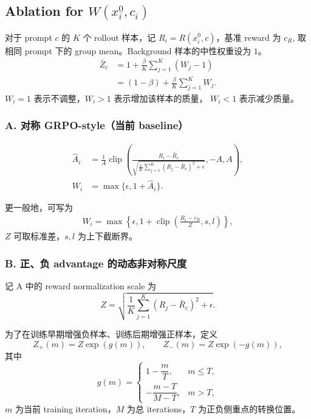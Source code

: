\documentclass[10pt]{article}
\begin{document}
\newpage 

\subsection{Ablation for $W(x_i^0,c_i)$}

对于 prompt $c$ 的 $K$ 个 rollout 样本，记
$R_i=R(x_i^0,c)$，基准 reward 为 $c_R$, 取相同 prompt 下的 group mean。Background 样本的中性权重设为 $1$。
\begin{align}
\bar Z_c
&=1+\frac{\beta}{K}\sum_{j=1}^{K}(W_j-1) \\
&=(1-\beta)+\frac{\beta}{K}\sum_{j=1}^{K}W_j.
\end{align}
$W_i=1$ 表示不调整，$W_i>1$ 表示增加该样本的质量，
$W_i<1$ 表示减少质量。

\subsubsection*{A. 对称 GRPO-style（当前 baseline）}

\begin{align}
\widehat A_i
&=
\frac{1}{A}
\operatorname{clip}\!\left(
\frac{R_i-\bar R_c}
{\sqrt{\frac{1}{K}\sum_{j=1}^{K}(R_j-\bar R_c)^2+\epsilon}},
-A,A
\right), \\
W_i
&=\max\{\epsilon,1+\widehat A_i\}.
\end{align}

更一般地，可写为
\begin{align}
W_i
=\max\!\left\{
\epsilon,
1+\operatorname{clip}\!\left(
\frac{R_i-c_R}{Z},s,l
\right)
\right\},
\end{align}
$Z$ 可取标准差，$s,l$ 为上下截断界。


\subsubsection*{B. 正、负 advantage 的动态非对称尺度}

记 A 中的 reward normalization scale 为
\begin{equation}
Z=
\sqrt{
\frac{1}{K}\sum_{j=1}^{K}(R_j-\bar R_c)^2+\epsilon
}.
\end{equation}

为了在训练早期增强负样本、训练后期增强正样本，定义
\begin{equation}
Z_+(m)=Z\exp(g(m)),
\qquad
Z_-(m)=Z\exp(-g(m)),
\end{equation}
其中
\begin{equation}
g(m)=
\begin{cases}
1-\dfrac{m}{T}, & m\le T,\\[6pt]
-\dfrac{m-T}{M-T}, & m>T,
\end{cases}
\end{equation}
$m$ 为当前 training iteration，$M$ 为总 iterations，$T$ 为正负侧重点的转换位置。
\end{document}
